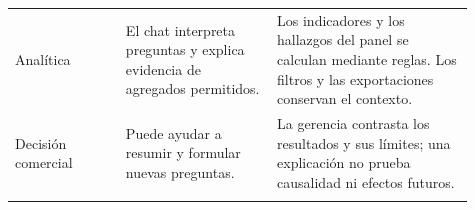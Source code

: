 \begin{longtable}{@{}>{\RaggedRight\arraybackslash}p{0.22\linewidth}>{\RaggedRight\arraybackslash}p{0.3\linewidth}>{\RaggedRight\arraybackslash}p{0.39\linewidth}@{}}
\addlinespace[3pt]
Analítica & El chat interpreta preguntas y explica evidencia de agregados permitidos. & Los indicadores y los hallazgos del panel se calculan mediante reglas. Los filtros y las exportaciones conservan el contexto. \\
\addlinespace[3pt]
Decisión comercial & Puede ayudar a resumir y formular nuevas preguntas. & La gerencia contrasta los resultados y sus límites; una explicación no prueba causalidad ni efectos futuros. \\
\addlinespace[3pt]
\end{longtable}
\endgroup


